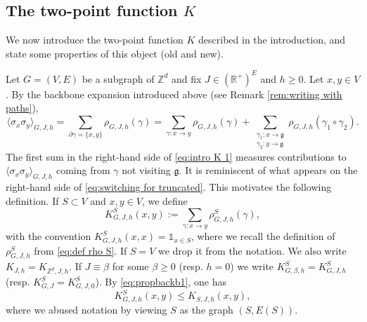 \documentclass[11pt,a4paper]{article}
\numberwithin{equation}{section}
\theoremstyle{plain}
\theoremstyle{definition}
\newcommand\fg{\mathfrak{g}}
\begin{document}
	


\subsection{The two-point function $K$}\label{sec:2pt K}

We now introduce the two-point function $K$ described in the introduction, and state some properties of this object (old and new).

 Let $G=(V,E)$ be a subgraph of $\mathbb Z^d$ and fix $J\in (\mathbb R^+)^E$ and
$h\geq 0$. Let $x,y\in V$. By the backbone expansion introduced above (see Remark \ref{rem:writing with paths}),
\begin{equation}\label{eq:intro K 1}
	\langle \sigma_x\sigma_y\rangle_{G,J,h}=\sum_{\partial \gamma=\{x,y\}}\rho_{G,J,h}(\gamma)=\sum_{\gamma:x\rightarrow y}\rho_{G,J,h}(\gamma)+\sum_{\substack{\gamma_1:x\rightarrow \fg\\\gamma_2:y\rightarrow \fg}}\rho_{G,J,h}(\gamma_1\circ \gamma_2).
\end{equation}
The first sum in the right-hand side of \eqref{eq:intro K 1} measures contributions to $\langle \sigma_x\sigma_y\rangle_{G,J,h}$ coming from $\gamma$ not visiting $\fg$. It is reminiscent of what appears on the right-hand side of \eqref{eq:switching for truncated}. This motivates the following definition. If $S\subset V$ and $x,y\in V$, we define
\begin{equation}
	K_{G,J,h}^S(x,y):=\sum_{\gamma:x\rightarrow y}\rho_{G,J,h}^S(\gamma),
\end{equation}
with the convention $K_{G,J,h}^S(x,x)=\mathds{1}_{x\in S}$,
where we recall the definition of $\rho_{G,J,h}^S$ from \eqref{eq:def rho S}.
If $S=V$ we drop it from the notation. We also write $K_{J,h}=K_{\mathbb Z^d,J,h}$. If $J\equiv \beta$ for some $\beta\geq 0$ (resp. $h=0$) we write $K^S_{G,\beta,h}=K_{G,J,h}^S$ (resp. $K^S_{G,J}=K^S_{G,J,0}$). By \eqref{eq:propbackb1}, one has
\begin{equation}\label{eq: K^S vs K_S}
	K^S_{G,J,h}(x,y)\leq K_{S,J,h}(x,y),
\end{equation}
where we abused notation by viewing $S$ as the graph $(S,E(S))$.
\end{document}

